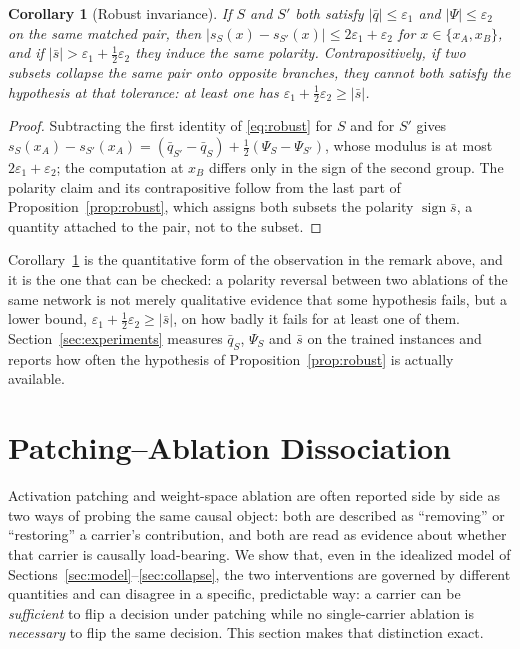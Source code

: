 \documentclass[11pt,a4paper]{article}
\newtheorem{corollary}{Corollary}
\begin{document}
\begin{corollary}[Robust invariance]
\label{cor:robustinvariance}
If $S$ and $S'$ both satisfy $|\bar q|\le\varepsilon_1$ and
$|\Psi|\le\varepsilon_2$ on the same matched pair, then
$\bigl|s_S(x)-s_{S'}(x)\bigr|\le2\varepsilon_1+\varepsilon_2$ for
$x\in\{x_A,x_B\}$, and if $|\bar s|>\varepsilon_1+\tfrac12\varepsilon_2$ they
induce the \emph{same} polarity. Contrapositively, if two subsets collapse the
same pair onto \emph{opposite} branches, they cannot both satisfy the
hypothesis at that tolerance: at least one has
$\varepsilon_1+\tfrac12\varepsilon_2\ge|\bar s|$.
\end{corollary}

\begin{proof}
Subtracting the first identity of \eqref{eq:robust} for $S$ and for $S'$ gives
$s_S(x_A)-s_{S'}(x_A)=(\bar q_{S'}-\bar q_S)+\tfrac12(\Psi_S-\Psi_{S'})$, whose
modulus is at most $2\varepsilon_1+\varepsilon_2$; the computation at $x_B$
differs only in the sign of the second group. The polarity claim and its
contrapositive follow from the last part of Proposition~\ref{prop:robust},
which assigns both subsets the polarity $\operatorname{sign}\bar s$, a
quantity attached to the pair, not to the subset.
\end{proof}

Corollary~\ref{cor:robustinvariance} is the quantitative form of the
observation in the remark above, and it is the one that can be checked: a
polarity reversal between two ablations of the same network is not merely
qualitative evidence that some hypothesis fails, but a lower bound,
$\varepsilon_1+\tfrac12\varepsilon_2\ge|\bar s|$, on how badly it fails for at
least one of them. Section~\ref{sec:experiments} measures
$\bar q_S$, $\Psi_S$ and $\bar s$ on the trained instances and reports how often
the hypothesis of Proposition~\ref{prop:robust} is actually available.

\section{Patching--Ablation Dissociation}
\label{sec:dissociation}

Activation patching and weight-space ablation are often reported side by side
as two ways of probing the same causal object: both are described as
``removing'' or ``restoring'' a carrier's contribution, and both are read as
evidence about whether that carrier is causally load-bearing. We show that,
even in the idealized model of Sections~\ref{sec:model}--\ref{sec:collapse},
the two interventions are governed by different quantities and can disagree
in a specific, predictable way: a carrier can be \emph{sufficient} to flip a
decision under patching while no single-carrier ablation is
\emph{necessary} to flip the same decision. This section makes that
distinction exact.
\end{document}
